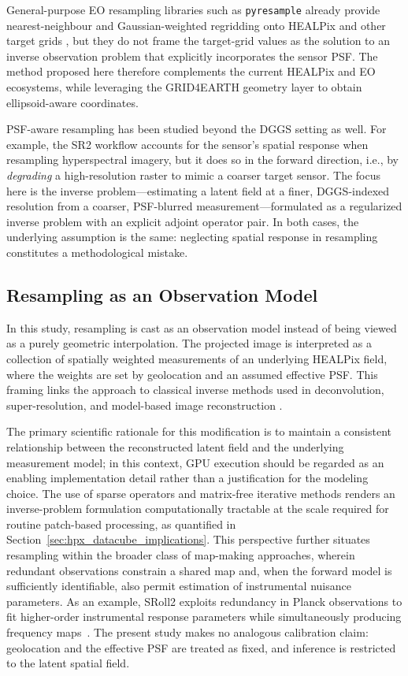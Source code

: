 \documentclass[journal]{IEEEtran}
\newcommand{\healpix}{HEALPix\xspace}
\newcommand{\psf}{PSF\xspace}
\begin{document}
General-purpose EO resampling libraries such as \texttt{pyresample} already provide nearest-neighbour and Gaussian-weighted regridding onto \healpix and other target grids \cite{hoese2020pyresample}, but they do not frame the target-grid values as the solution to an inverse observation problem that explicitly incorporates the sensor \psf. The method proposed here therefore complements the current \healpix and EO ecosystems, while leveraging the GRID4EARTH geometry layer to obtain ellipsoid-aware coordinates.

\psf-aware resampling has been studied beyond the DGGS setting as well. For example, the SR2 workflow \cite{inamdar2023sr2} accounts for the sensor’s spatial response when resampling hyperspectral imagery, but it does so in the forward direction, i.e., by \emph{degrading} a high-resolution raster to mimic a coarser target sensor. The focus here is the inverse problem—estimating a latent field at a finer, DGGS-indexed resolution from a coarser, \psf-blurred measurement—formulated as a regularized inverse problem with an explicit adjoint operator pair. In both cases, the underlying assumption is the same: neglecting spatial response in resampling constitutes a methodological mistake.

\subsection{Resampling as an Observation Model}

In this study, resampling is cast as an observation model instead of being viewed as a purely geometric interpolation. The projected image is interpreted as a collection of spatially weighted measurements of an underlying \healpix field, where the weights are set by geolocation and an assumed effective \psf. This framing links the approach to classical inverse methods used in deconvolution, super-resolution, and model-based image reconstruction \cite{bertero1998inverse,starck1998deconvolution,richardson1972bayesian,lucy1974iterative,park2003superresolution}.

The primary scientific rationale for this modification is to maintain a consistent relationship between the reconstructed latent field and the underlying measurement model; in this context, GPU execution should be regarded as an enabling implementation detail rather than a justification for the modeling choice. The use of sparse operators and matrix-free iterative methods renders an inverse-problem formulation computationally tractable at the scale required for routine patch-based processing, as quantified in Section~\ref{sec:hpx_datacube_implications}. This perspective further situates resampling within the broader class of map-making approaches, wherein redundant observations constrain a shared map and, when the forward model is sufficiently identifiable, also permit estimation of instrumental nuisance parameters. As an example, SRoll2 exploits redundancy in Planck observations to fit higher-order instrumental response parameters while simultaneously producing frequency maps~\cite{delouis2019sroll2}. The present study makes no analogous calibration claim: geolocation and the effective \psf are treated as fixed, and inference is restricted to the latent spatial field.
\end{document}

